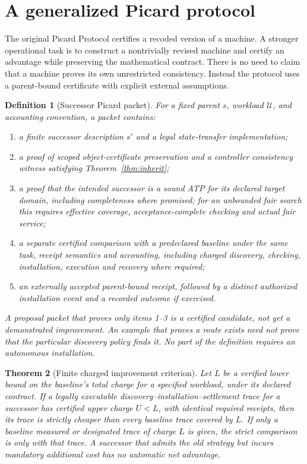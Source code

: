 \documentclass[11pt]{article}
\newtheorem{theorem}{Theorem}[section]
\newtheorem{definition}[theorem]{Definition}
\theoremstyle{remark}\newtheorem{remark}[theorem]{Remark}
\begin{document}
\section{A generalized Picard protocol}
The original Picard Protocol certifies a recoded version of a machine. A stronger operational task is to construct a nontrivially revised machine and certify an advantage while preserving the mathematical contract. There is no need to claim that a machine proves its own unrestricted consistency. Instead the protocol uses a parent-bound certificate with explicit external assumptions.
\begin{definition}[Successor Picard packet]
For a fixed parent $s$, workload $\mathcal U$, and accounting convention, a packet contains:
\begin{enumerate}
\item a finite successor description $s'$ and a legal state-transfer implementation;
\item a proof of scoped object-certificate preservation and a controller consistency witness satisfying Theorem~\ref{thm:inherit};
\item a proof that the intended successor is a sound ATP for its declared target domain, including completeness where promised; for an unbounded fair search this requires effective coverage, acceptance-complete checking and actual fair service;
\item a separate certified comparison with a predeclared baseline under the same task, receipt semantics and accounting, including charged discovery, checking, installation, execution and recovery where required;
\item an externally accepted parent-bound receipt, followed by a distinct authorized installation event and a recorded outcome if exercised.
\end{enumerate}
A proposal packet that proves only items 1--3 is a certified candidate, not yet a demonstrated improvement. An example that proves a route exists need not prove that the particular discovery policy finds it. No part of the definition requires an autonomous installation.
\end{definition}
\begin{theorem}[Finite charged improvement criterion]\label{thm:cost}
Let $L$ be a verified lower bound on the baseline's total charge for a specified workload, under its declared contract. If a legally executable discovery--installation--settlement trace for a successor has certified upper charge $U<L$, with identical required receipts, then its trace is strictly cheaper than every baseline trace covered by $L$. If only a baseline measured or designated trace of charge $L$ is given, the strict comparison is only with that trace. A successor that admits the old strategy but incurs mandatory additional cost has no automatic net advantage.
\end{theorem}
\end{document}
